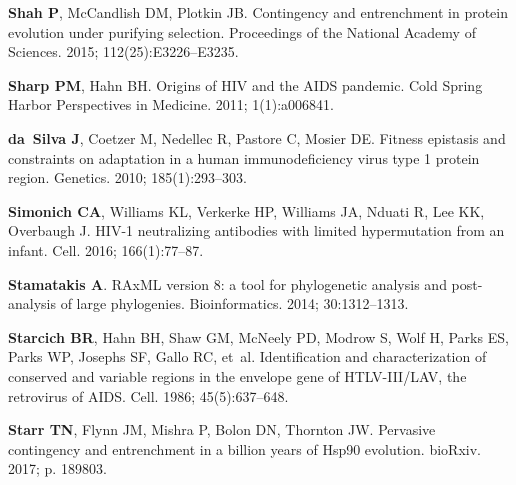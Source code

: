 \documentclass[9pt]{elife}
\begin{document}
\begin{thebibliography}{114}
\textbf{\color{eLifeMediumGrey} Shah P}, McCandlish DM, Plotkin JB.
\newblock Contingency and entrenchment in protein evolution under purifying
  selection.
\newblock Proceedings of the National Academy of Sciences.  2015;
  112(25):E3226--E3235.

\textbf{\color{eLifeMediumGrey} Sharp PM}, Hahn BH.
\newblock Origins of {HIV} and the {AIDS} pandemic.
\newblock Cold Spring Harbor Perspectives in Medicine.  2011; 1(1):a006841.

\textbf{\color{eLifeMediumGrey} da~Silva J}, Coetzer M, Nedellec R, Pastore C,
  Mosier DE.
\newblock Fitness epistasis and constraints on adaptation in a human
  immunodeficiency virus type 1 protein region.
\newblock Genetics.  2010; 185(1):293--303.

\textbf{\color{eLifeMediumGrey} Simonich CA}, Williams KL, Verkerke HP,
  Williams JA, Nduati R, Lee KK, Overbaugh J.
\newblock HIV-1 neutralizing antibodies with limited hypermutation from an
  infant.
\newblock Cell.  2016; 166(1):77--87.

\textbf{\color{eLifeMediumGrey} Stamatakis A}.
\newblock RAxML version 8: a tool for phylogenetic analysis and post-analysis
  of large phylogenies.
\newblock Bioinformatics.  2014; 30:1312--1313.

\textbf{\color{eLifeMediumGrey} Starcich BR}, Hahn BH, Shaw GM, McNeely PD,
  Modrow S, Wolf H, Parks ES, Parks WP, Josephs SF, Gallo RC, et~al.
\newblock Identification and characterization of conserved and variable regions
  in the envelope gene of HTLV-III/LAV, the retrovirus of AIDS.
\newblock Cell.  1986; 45(5):637--648.

\textbf{\color{eLifeMediumGrey} Starr TN}, Flynn JM, Mishra P, Bolon DN,
  Thornton JW.
\newblock Pervasive contingency and entrenchment in a billion years of Hsp90
  evolution.
\newblock bioRxiv.  2017; p. 189803.


\end{thebibliography}
\end{document}
